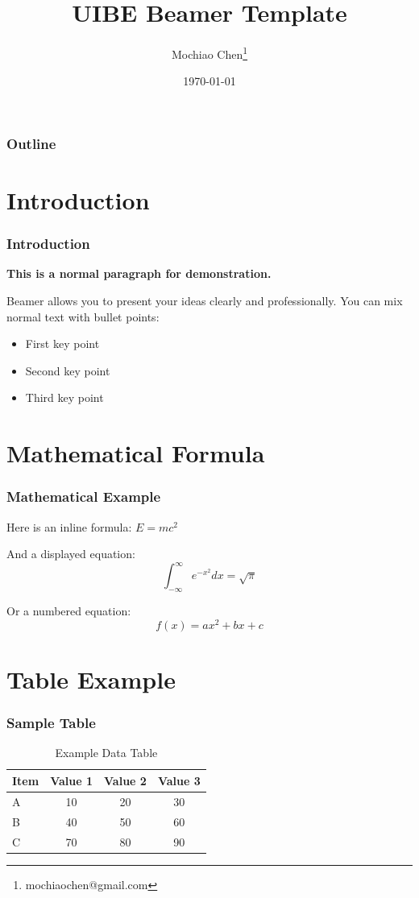 \documentclass[16pt]{beamer}
\title{UIBE Beamer Template}
\author{Mochiao Chen\thanks{mochiaochen@gmail.com}}
\date{\today}
\begin{document}
\begin{frame}
  \titlepage
\end{frame}

\begin{frame}
  \frametitle{Outline}
  \tableofcontents
\end{frame}

\section{Introduction}
\begin{frame}
  \frametitle{Introduction}
  \textbf{This is a normal paragraph for demonstration.}
  
  Beamer allows you to present your ideas clearly and professionally.
  You can mix normal text with bullet points:
  
  \begin{itemize}
    \item First key point
    \item Second key point
    \item Third key point
  \end{itemize}
\end{frame}

\section{Mathematical Formula}
\begin{frame}
  \frametitle{Mathematical Example}
  
  Here is an inline formula: \( E = mc^2 \)

  And a displayed equation:
  \[
    \int_{-\infty}^{\infty} e^{-x^2} dx = \sqrt{\pi}
  \]

  Or a numbered equation:
  \begin{equation}
    f(x) = ax^2 + bx + c
  \end{equation}
\end{frame}

\section{Table Example}
\begin{frame}
  \frametitle{Sample Table}
  
  \begin{table}[h!]
    \centering
    \caption{Example Data Table}
    \begin{tabular}{lccc}
      \toprule
      Item & Value 1 & Value 2 & Value 3 \\
      \midrule
      A & 10 & 20 & 30 \\
      B & 40 & 50 & 60 \\
      C & 70 & 80 & 90 \\
      \bottomrule
    \end{tabular}
  \end{table}
\end{frame}
\end{document}
